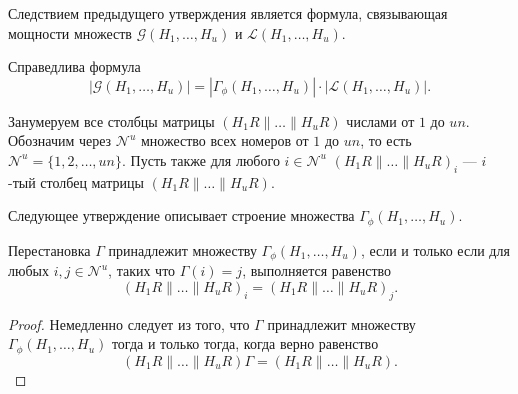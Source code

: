 Следствием предыдущего утверждения является формула, связывающая
мощности множеств $\mathcal G(H_1,\ldots,H_u)$ и $\mathcal
L(H_1,\ldots,H_u)$.
\begin{proposition}
\label{prop1} Справедлива формула
$$
|\mathcal
G(H_1,\ldots,H_u)|=|\Gamma_{\phi}(H_1,\ldots,H_u)|\cdot|\mathcal
L(H_1,\ldots,H_u)|.
$$
\end{proposition}

Занумеруем все столбцы матрицы $(H_1R\|\ldots\|H_uR)$ числами от
$1$ до $un$. Обозначим через $\mathcal N^u$ множество всех номеров
от $1$ до $un$, то есть $\mathcal N^u=\{1,2,\ldots,un\}$. Пусть
также для любого $i\in\mathcal{N}^u$ $(H_1R\|\ldots\|H_uR)_i$ ---
$i$-тый столбец матрицы $(H_1R\|\ldots\|H_uR)$.

Следующее утверждение описывает строение множества
$\Gamma_{\phi}(H_1,\ldots,H_u)$.

\begin{proposition} \label{prop43}
Перестановка $\Gamma$ принадлежит множеству
$\Gamma_{\phi}(H_1,\ldots,H_u)$, если и только если для любых
$i,j\in \mathcal{N}^u$, таких что $\Gamma(i)=j$, выполняется
равенство
 $$
 (H_1R\|\ldots\|H_uR)_i=(H_1R\|\ldots\|H_uR)_j.
 $$
\end{proposition}

\begin{proof}
Немедленно следует из того, что $\Gamma$ принадлежит множеству
$\Gamma_{\phi}(H_1,\ldots,H_u)$ тогда и только тогда, когда верно
равенство
 $$
 (H_1R\|\ldots\|H_uR)\Gamma=(H_1R\|\ldots\|H_uR).
 $$
\end{proof}


